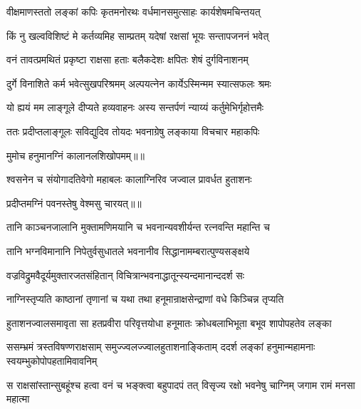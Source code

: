 \twolineshloka
{वीक्षमाणस्ततो लङ्कां कपिः कृतमनोरथः}
{वर्धमानसमुत्साहः कार्यशेषमचिन्तयत्} %

\twolineshloka
{किं नु खल्वविशिष्टं मे कर्तव्यमिह साम्प्रतम्}
{यदेषां रक्षसां भूयः सन्तापजननं भवेत्} %

\twolineshloka
{वनं तावत्प्रमथितं प्रकृष्टा राक्षसा हताः}
{बलैकदेशः क्षपितः शेषं दुर्गविनाशनम्} %

\twolineshloka
{दुर्गे विनाशिते कर्म भवेत्सुखपरिश्रमम्}
{अल्पयत्नेन कार्येऽस्मिन्मम स्यात्सफलः श्रमः} %

\twolineshloka
{यो ह्ययं मम लाङ्गूले दीप्यते हव्यवाहनः}
{अस्य सन्तर्पणं न्याय्यं कर्तुमेभिर्गृहोत्तमैः} %

\twolineshloka
{ततः प्रदीप्तलाङ्गूलः सविद्युदिव तोयदः}
{भवनाग्रेषु लङ्काया विचचार महाकपिः} %

{मुमोच हनुमानग्निं कालानलशिखोपमम्॥॥} %

\addtocounter{shlokacount}{1}

\twolineshloka
{श्वसनेन च संयोगादतिवेगो महाबलः}
{कालाग्निरिव जज्वाल प्रावर्धत हुताशनः} %

{प्रदीप्तमग्निं पवनस्तेषु वेश्मसु चारयत्॥॥} %

\addtocounter{shlokacount}{1}

\twolineshloka
{तानि काञ्चनजालानि मुक्तामणिमयानि च}
{भवनान्यवशीर्यन्त रत्नवन्ति महान्ति च} %

\twolineshloka
{तानि भग्नविमानानि निपेतुर्वसुधातले}
{भवनानीव सिद्धानामम्बरात्पुण्यसङ्क्षये} %

\twolineshloka
{वज्रविद्रुमवैदूर्यमुक्तारजतसंहितान्}
{विचित्रान्भवनाद्धातून्स्यन्दमानान्ददर्श सः} %

\twolineshloka
{नाग्निस्तृप्यति काष्ठानां तृणानां च यथा तथा}
{हनूमान्राक्षसेन्द्राणां वधे किञ्चिन्न तृप्यति} %

\fourlineindentedshloka
{हुताशनज्वालसमावृता सा}
{हतप्रवीरा परिवृत्तयोधा}
{हनूमातः क्रोधबलाभिभूता}
{बभूव शापोपहतेव लङ्का} %

\fourlineindentedshloka
{ससम्भ्रमं त्रस्तविषण्णराक्षसाम्}
{समुज्ज्वलज्ज्वालहुताशनाङ्किताम्}
{ददर्श लङ्कां हनुमान्महामनाः}
{स्वयम्भुकोपोपहतामिवावनिम्} %

\fourlineindentedshloka
{स राक्षसांस्तान्सुबहूंश्च हत्वा}
{वनं च भङ्क्त्वा बहुपादपं तत्}
{विसृज्य रक्षो भवनेषु चाग्निम्}
{जगाम रामं मनसा महात्मा} %

